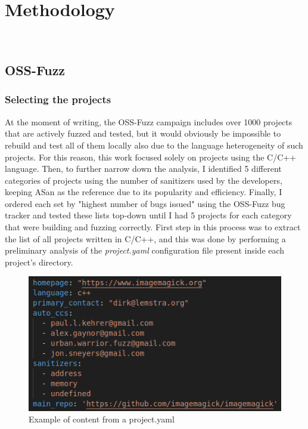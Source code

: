 \documentclass[Lau,oneside]{sapthesis}%
\begin{document}
\chapter{Methodology}
\ \\
\section{OSS-Fuzz}
\subsection{Selecting the projects} \label{selection}
At the moment of writing, the OSS-Fuzz campaign includes over 1000 projects that are actively fuzzed and tested, but it would obviously be impossible to rebuild and test all of them locally also due to the language heterogeneity of such projects.
\newline
For this reason, this work focused solely on projects using the C/C++ language.
\newline
Then, to further narrow down the analysis, I identified 5 different categories of projects using the number of sanitizers used by the developers, keeping ASan as the reference due to its popularity and efficiency.
\newline
Finally, I ordered each set by "highest number of bugs issued" using the OSS-Fuzz bug tracker and tested these lists top-down until I had 5 projects for each category that were building and fuzzing correctly.
\newline \newline \newline
First step in this process was to extract the list of all projects written in C/C++, and this was done by performing a preliminary analysis of the \textit{project.yaml} configuration file present inside each project's directory.
\newline
\begin{figure}[h]
\centering
\includegraphics[scale=0.5]{foto/project_yaml.png}
\caption{Example of content from a project.yaml}
\label{fig:project_yaml}
\end{figure}
\end{document}
